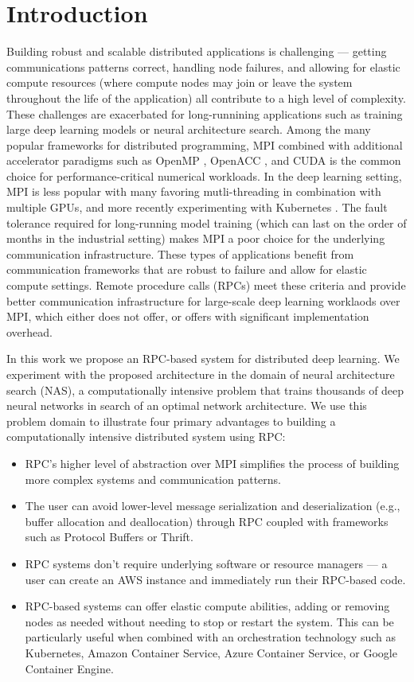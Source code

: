 \documentclass[conference]{IEEEtran}
\begin{document}
\section{Introduction}
Building robust and scalable distributed applications is challenging --- getting
communications patterns correct, handling node failures, and allowing for
elastic compute resources (where compute nodes may join or leave the system
throughout the life of the application) all contribute to a high level of
complexity. These challenges are exacerbated for long-runnining applications
such as training large deep learning models or neural architecture search. Among
the many popular frameworks for distributed programming, MPI
\cite{Forum:1994:MMI:898758} combined with additional accelerator paradigms such
as OpenMP \cite{Dagum:1998:OIA:615255.615542}, OpenACC
\cite{Wienke:2012:OFE:2402420.2402522}, and CUDA
\cite{Nickolls:2008:SPP:1365490.1365500} is the common choice for
performance-critical numerical workloads. In the deep learning setting, MPI is
less popular with many favoring mutli-threading in combination with multiple
GPUs, and more recently experimenting with Kubernetes \cite{8094194,
  8672301}. The fault tolerance required for long-running model training (which
can last on the order of months in the industrial setting) makes MPI a poor
choice for the underlying communication infrastructure. These types of applications
benefit from communication frameworks that are robust to failure and allow
for elastic compute settings. Remote procedure calls (RPCs) meet these
criteria and provide better communication infrastructure for large-scale
deep learning worklaods over MPI, which either does not offer, or offers with
significant implementation overhead.

In this work we propose an RPC-based system for distributed deep learning. We
experiment with the proposed architecture in the domain of neural architecture
search (NAS), a computationally intensive problem that trains thousands of deep
neural networks in search of an optimal network architecture.  We use this
problem domain to illustrate four primary advantages to building a
computationally intensive distributed system using RPC:
\begin{itemize}
\item RPC's higher level of abstraction over MPI simplifies the process of
  building more complex systems and communication patterns.
\item The user can avoid lower-level message serialization and deserialization
  (e.g., buffer allocation and deallocation)
  through RPC coupled with frameworks such as Protocol Buffers or Thrift.
\item RPC systems don't require underlying software or resource managers --- a
  user can create an AWS instance and immediately run their RPC-based code.
\item RPC-based systems can offer elastic compute abilities, adding or removing
  nodes as needed without needing to stop or restart the system. This can be
  particularly useful when combined with an orchestration technology such as
  Kubernetes, Amazon Container Service, Azure Container Service, or Google
  Container Engine.
\end{itemize}
\end{document}
